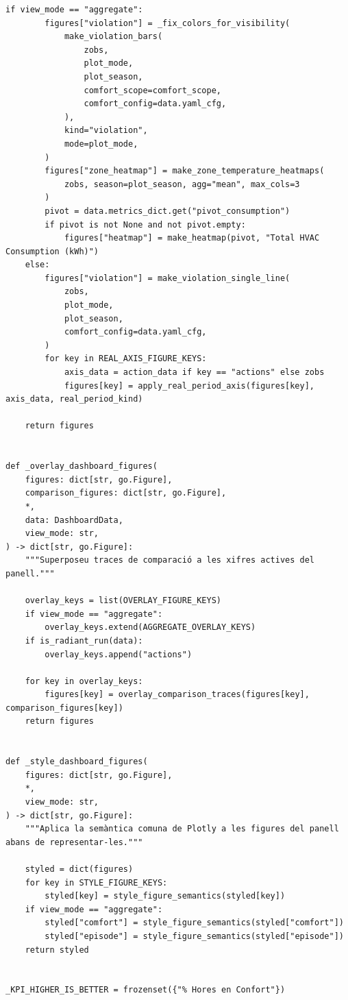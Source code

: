 \documentclass[10pt,a4paper]{article}
\begin{document}
\begin{lstlisting}[style=studioPython,caption={page\_components/resultats\_dashboard.py},label={lst:page-components-resultats-dashboard-py}]
    if view_mode == "aggregate":
        figures["violation"] = _fix_colors_for_visibility(
            make_violation_bars(
                zobs,
                plot_mode,
                plot_season,
                comfort_scope=comfort_scope,
                comfort_config=data.yaml_cfg,
            ),
            kind="violation",
            mode=plot_mode,
        )
        figures["zone_heatmap"] = make_zone_temperature_heatmaps(
            zobs, season=plot_season, agg="mean", max_cols=3
        )
        pivot = data.metrics_dict.get("pivot_consumption")
        if pivot is not None and not pivot.empty:
            figures["heatmap"] = make_heatmap(pivot, "Total HVAC Consumption (kWh)")
    else:
        figures["violation"] = make_violation_single_line(
            zobs,
            plot_mode,
            plot_season,
            comfort_config=data.yaml_cfg,
        )
        for key in REAL_AXIS_FIGURE_KEYS:
            axis_data = action_data if key == "actions" else zobs
            figures[key] = apply_real_period_axis(figures[key], axis_data, real_period_kind)

    return figures


def _overlay_dashboard_figures(
    figures: dict[str, go.Figure],
    comparison_figures: dict[str, go.Figure],
    *,
    data: DashboardData,
    view_mode: str,
) -> dict[str, go.Figure]:
    """Superposeu traces de comparació a les xifres actives del panell."""

    overlay_keys = list(OVERLAY_FIGURE_KEYS)
    if view_mode == "aggregate":
        overlay_keys.extend(AGGREGATE_OVERLAY_KEYS)
    if is_radiant_run(data):
        overlay_keys.append("actions")

    for key in overlay_keys:
        figures[key] = overlay_comparison_traces(figures[key], comparison_figures[key])
    return figures


def _style_dashboard_figures(
    figures: dict[str, go.Figure],
    *,
    view_mode: str,
) -> dict[str, go.Figure]:
    """Aplica la semàntica comuna de Plotly a les figures del panell abans de representar-les."""

    styled = dict(figures)
    for key in STYLE_FIGURE_KEYS:
        styled[key] = style_figure_semantics(styled[key])
    if view_mode == "aggregate":
        styled["comfort"] = style_figure_semantics(styled["comfort"])
        styled["episode"] = style_figure_semantics(styled["episode"])
    return styled


_KPI_HIGHER_IS_BETTER = frozenset({"% Hores en Confort"})



\end{lstlisting}
\end{document}
